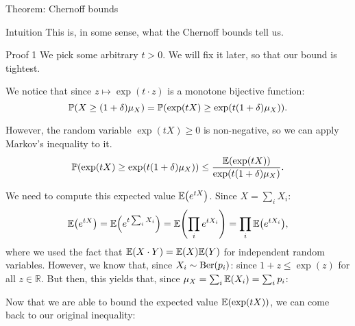 \documentclass[a4paper]{article}
\begin{document}
\begin{parag}{Theorem: Chernoff bounds}
\begin{subparag}{Intuition}
        This is, in some sense, what the Chernoff bounds tell us.
    \end{subparag}

    \begin{subparag}{Proof 1}
        We pick some arbitrary $t > 0$. We will fix it later, so that our bound is tightest.

        We notice that since $z \mapsto \exp\left(t\cdot z\right)$ is a monotone bijective function: 
        \[\prob\left(X \geq \left(1 + \delta\right) \mu_X\right) = \prob\left(\exp\left(tX\right) \geq \exp\left(t \left(1 + \delta\right) \mu_X\right)\right).\]

        However, the random variable $\exp\left(tX\right) \geq 0$ is non-negative, so we can apply Markov's inequality to it. 
        \[\prob\left(\exp\left(tX\right) \geq \exp\left(t \left(1 + \delta\right) \mu_X\right)\right) \leq \frac{\exval\left(\exp\left(tX\right)\right)}{\exp\left(t\left(1 + \delta\right)\mu_X\right)}.\]
        
        We need to compute this expected value $\exval\left(e^{tX}\right)$. Since $X = \sum_{i} X_i$: 
        \[\exval\left(e^{tX}\right) = \exval\left(e^{t \sum_{i} X_i}\right) = \exval\left(\prod_{i} e^{t X_i}\right) = \prod_{i} \exval\left(e^{t X_i}\right),\]
        where we used the fact that $\exval\left(X\cdot Y\right) = \exval\left(X\right)\exval\left(Y\right)$ for independent random variables. However, we know that, since $X_i \followsdistr \text{Ber}\left(p_i\right)$: 
        since $1 + z \leq \exp\left(z\right)$ for all $z \in \mathbb{R}$. But then, this yields that, since $\mu_X = \sum_{i} \exval\left(X_i\right) = \sum_{i} p_i$: 
        
        Now that we are able to bound the expected value $\exval\left(\exp\left(tX\right)\right)$, we can come back to our original inequality: 


\end{subparag}
\end{parag}
\end{document}
